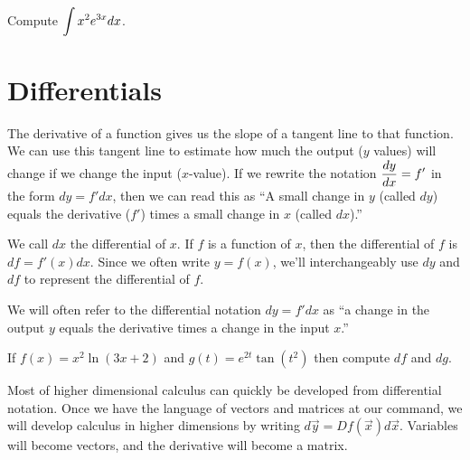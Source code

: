 \begin{problem}
Compute $\displaystyle \int x^2 e^{3x} dx$.
\end{problem}



\section{Differentials}
The derivative of a function gives us the slope of a tangent line to that function. We can use this tangent line to estimate how much the output ($y$ values) will change if we change the input ($x$-value). If we rewrite the notation $\displaystyle\frac{dy}{dx}=f'$ in the form $dy=f' dx$, then we can read this as ``A small change in $y$ (called $dy$) equals the derivative ($f'$) times a small change in $x$ (called $dx$).'' 

\begin{definition}
We call $dx$ the differential of $x$.  If $f$ is a function of $x$, then the differential of $f$ is $df = f'(x) dx$. Since we often write $y=f(x)$, we'll interchangeably use $dy$ and $df$ to represent the differential of $f$. 

We will often refer to the differential notation $dy=f'dx$ as ``a change in the output $y$ equals the derivative times a change in the input $x$.'' 
\end{definition}

\begin{problem}
If $f(x) = x^2\ln(3x+2)$ and $g(t) = e^{2t}\tan(t^2)$ then compute $df$ and $dg$.  
\end{problem}

Most of higher dimensional calculus can quickly be developed from differential notation. Once we have the language of vectors and matrices at our command, we will develop calculus in higher dimensions by writing $d\vec y = Df(\vec x) d\vec x$.  Variables will become vectors, and the derivative will become a matrix.
 
